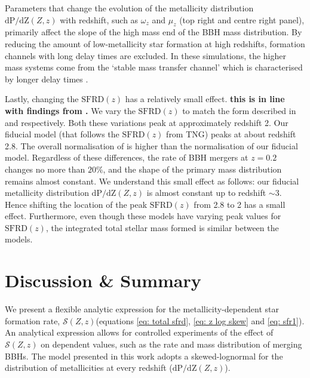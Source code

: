 \documentclass[twocolumn]{aastex631}
\newcommand{\SFRDzZ}{\ensuremath{\mathcal{S}(Z,z)}\xspace}
\newcommand{\SFRDz}{\ensuremath{\mathrm{SFRD}(z)}\xspace}
\newcommand{\dpdZ}{\ensuremath{\mathrm{dP/dZ}(Z,z)}\xspace}
\newcommand{\todo}[1]{{\color{purple}\bf{#1}}}
\begin{document}
Parameters that change the evolution of the metallicity distribution \dpdZ with redshift, such as $\omega_z$ and $\mu_z$ (top right and centre right panel), primarily affect the slope of the high mass end of the BBH mass distribution.
By reducing the amount of low-metallicity star formation at high redshifts, formation channels with long delay times are excluded. In these simulations, the higher mass systems come from the `stable mass transfer channel' which is characterised by longer delay times \citep[][see also their Figure 6]{vanson+2022}.  


Lastly, changing the \SFRDz has a relatively small effect. 
\todo{this is in line with findings from \citep{Tang+2020}.}
We vary the \SFRDz to match the form described in \cite{Madau+2017} and \cite{Neijssel+2019} respectively. Both these variations peak at approximately redshift 2. Our fiducial model (that follows the \SFRDz from TNG) peaks at about redshift 2.8. The overall normalisation of \cite{Neijssel+2019} is higher than the normalisation of our fiducial model. Regardless of these differences, the rate of BBH mergers at $z=0.2$ changes no more than $20\%$, and the shape of the primary mass distribution remains almost constant. We understand this small effect as follows: our fiducial metallicity distribution \dpdZ is almost constant up to redshift $\sim3$. Hence shifting the location of the peak \SFRDz from 2.8 to 2 has a small effect. Furthermore, even though these models have varying peak values for \SFRDz, the integrated total stellar mass formed is similar between the models. %


\section{Discussion \& Summary \label{sec: summary}}
We present a flexible analytic expression for the metallicity-dependent star formation rate, \SFRDzZ (equations \ref{eq: total sfrd}, \ref{eq: z log skew} and \ref{eq: sfr1}). An analytical expression allows for controlled experiments of the effect of \SFRDzZ on dependent values, such as the rate and mass distribution of merging BBHs. The model presented in this work adopts a skewed-lognormal for the distribution of metallicities at every redshift (\dpdZ). 
\end{document}
